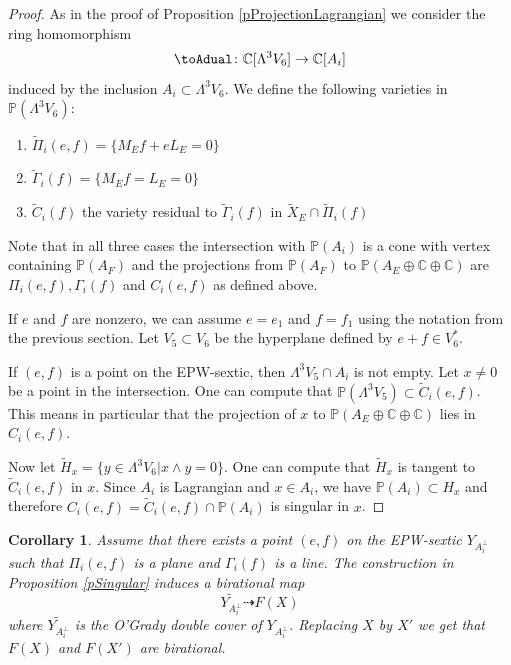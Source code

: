 \documentclass[11pt]{amsart}
\theoremstyle{plain}
\newtheorem{corollary}[theorem]{Corollary}
\numberwithin{equation}{section}
\theoremstyle{definition}
\theoremstyle{remark}
\newcommand{\C}{\mathbb C}
\renewcommand{\P}{\mathbb P}
\begin{document}
\begin{proof}
As in the proof of Proposition \ref{pProjectionLagrangian} we consider the
ring homomorphism
\[
    \toAdual \colon \C[\Lambda^3 V_6] \to \C[A_i]
\]
induced by the inclusion $A_i \subset \Lambda^3 V_6$. We define the following varieties in $\P(\Lambda^3 V_6)$:
\begin{enumerate}[label={(\arabic*)}]
    \item $\widetilde{\Pi}_i(e,f) =  \{ M_E f + eL_E = 0 \}$
    \item $\widetilde{\Gamma}_i(f) =  \{ M_E f  = L_E = 0 \}$ 
    \item $\widetilde{C}_i(f)$ the variety residual to $\widetilde{\Gamma}_i(f)$ in $\widetilde{X}_E \cap \widetilde{\Pi}_i(f)$
\end{enumerate}
Note that in all three cases the intersection with $\P(A_i)$ is a cone with vertex containing $\P(A_F)$ and the projections from $\P(A_F)$ to $\P(A_E \oplus \C \oplus \C)$
are $\Pi_i(e,f), \Gamma_i(f)$ and $C_i(e,f)$ as defined above. 

If $e$ and $f$ are nonzero, we can assume $e=e_1$ and $f=f_1$ using the notation from the previous section. Let $V_5 \subset V_6$ be the hyperplane defined by $e+f \in V_6^*$. 

If $(e,f)$ is a point on the EPW-sextic, then $\Lambda^3 V_5 \cap A_i$
is not empty. Let $x \not= 0$ be a point in the intersection. 
One can compute \cite[Sections5-8.m2]{MacaulayFiles} that $\P(\Lambda^3 V_5) \subset \widetilde{C}_i(e,f)$. This means in particular that the projection of $x$ to $\P(A_E \oplus \C \oplus \C)$ lies in $C_i(e,f)$. 

Now let $\widetilde{H}_x= \{ y \in \Lambda^3 V_6 | x \wedge y =0 \}$. One can compute that $\widetilde{H}_x$ is tangent to $\widetilde{C}_i(e,f)$ in $x$. Since $A_i$ is Lagrangian and $x\in A_i$, we have $\P(A_i) \subset H_x$ and therefore $C_i (e,f)=  \widetilde{C}_i(e,f) \cap \P(A_i)$ is singular in $x$.
\end{proof}

\begin{corollary}\label{cBirFanos}
Assume that there exists a point  $(e,f)$ on the EPW-sextic $Y_{A_i^\perp}$ such that $\Pi_i(e,f)$ is a plane and    $\Gamma_i(f)$ is a line.
The construction in Proposition \ref{pSingular} induces a birational map 
\[
\widetilde{Y_{A_i^\perp}} \dashrightarrow F(X)
\]
where $\widetilde{Y_{A_i^\perp}}$ is the O'Grady double cover of $Y_{A_i^\perp}$. Replacing $X$ by $X'$ we get that $F(X)$ and $F(X')$ are birational. 
\end{corollary}
\end{document}
